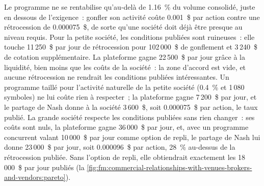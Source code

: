 \begin{omfigure}

\label{fig:fm:commercial-relationships-with-venues-brokers-and-vendors:value}
\end{omfigure}

Le programme ne se rentabilise qu'au-delà de 1.16~\% du volume consolidé, juste en dessous de l'exigence~: gonfler son activité coûte 0.001~\$ par action contre une rétrocession
de 0.000075~\$, de sorte qu'une société doit déjà être presque au niveau requis. Pour la petite société, les conditions publiées sont ruineuses~: elle touche 11\,250~\$ par jour de rétrocession pour
102\,000~\$ de gonflement et 3\,240~\$ de cotation supplémentaire. La plateforme gagne 22\,500~\$ par jour grâce à la liquidité, bien moins que les coûts de la société~: la zone
d'accord est vide, et aucune rétrocession ne rendrait les conditions publiées intéressantes. Un programme taillé pour l'activité naturelle de la petite société (0.4~\% et
1\,080 symboles) ne lui coûte rien à respecter~; la plateforme gagne 7\,200~\$ par jour, et le partage de Nash donne à la société 3\,600~\$, soit 0.000075~\$ par action, le
taux publié. La grande société respecte les conditions publiées sans rien changer~: ses coûts sont nuls, la plateforme gagne 36\,000~\$ par jour, et, avec
un programme concurrent valant 10\,000~\$ par jour comme option de repli, le partage de Nash lui donne 23\,000~\$ par jour, soit 0.000096~\$ par action, 28~\% au-dessus de la
rétrocession publiée. Sans l'option de repli, elle obtiendrait exactement les 18\,000~\$ par jour publiés
(la \cref{fig:fm:commercial-relationships-with-venues-brokers-and-vendors:pareto}).

